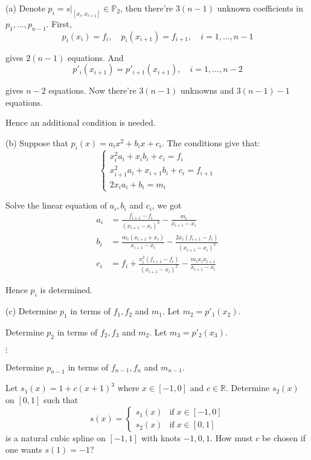 \documentclass[11pt]{elegantbook}
\begin{document}
\begin{solution}
  (a) Denote $p_i=s|_{[x_i,x_{i+1}]}\in\mathbb{P}_2$, then there're $3(n-1)$ unknown coefficients in $p_1,...,p_{n-1}$. First, 
  \begin{equation*}
    p_i(x_i)=f_i, \quad p_i(x_{i+1})=f_{i+1}, \quad i=1,...,n-1
  \end{equation*}

  gives $2(n-1)$ equations. And
  \begin{equation*}
    p'_i(x_{i+1})=p'_{i+1}(x_{i+1}), \quad i=1,...,n-2
  \end{equation*}

  gives $n-2$ equations. Now there're $3(n-1)$ unknowns and $3(n-1)-1$ equations. 
  
  Hence an additional condition is needed.

  (b) Suppose that $p_i(x)=a_ix^2+b_ix+c_i$. The conditions give that:
  \begin{equation*}
    \left\{ \begin{array}{l}x_i^2a_i+x_ib_i+c_i=f_i\\x_{i+1}^2a_i+x_{i+1}b_i+c_i=f_{i+1}\\2x_ia_i+b_i=m_i\end{array} \right.
  \end{equation*}

  Solve the linear equation of $a_i,b_i$ and $c_i$, we got
  \begin{align*}
    a_i&=\frac{f_{i+1}-f_i}{(x_{i+1}-x_i)^2}-\frac{m_i}{x_{i+1}-x_i}\\
    b_i&=\frac{m_i(x_{i+1}+x_i)}{x_{i+1}-x_i}-\frac{2x_i(f_{i+1}-f_i)}{(x_{i+1}-x_i)^2}\\
    c_i&=f_i+\frac{x_i^2(f_{i+1}-f_i)}{(x_{i+1}-x_i)^2} - \frac{m_ix_ix_{i+1}}{x_{i+1}-x_i}
  \end{align*}

  Hence $p_i$ is determined.

  (c) Determine $p_1$ in terms of $f_1,f_2$ and $m_1$. Let $m_2=p'_1(x_2)$.

  Determine $p_2$ in terms of $f_2,f_3$ and $m_2$. Let $m_3=p'_2(x_3)$.

  $\vdots$

  Determine $p_{n-1}$ in terms of $f_{n-1},f_n$ and $m_{n-1}$.

\end{solution}

\vspace{1.5em}

\begin{problem}
  Let $s_1(x)=1+c(x+1)^3$ where $x\in[-1,0]$ and $c\in \mathbb{R}$. Determine $s_2(x)$ on $[0,1]$ such that
  \begin{equation*}
    s(x)=\left\{\begin{array}{ll}s_1(x) & \text{if}\; x\in[-1,0]\\ s_2(x) & \text{if}\; x\in [0,1]\end{array}\right.
  \end{equation*}
  is a natural cubic spline on $[-1,1]$ with knots $-1,0,1$. How must $c$ be chosen if one wants $s(1)=-1$?
\end{problem}
\end{document}
